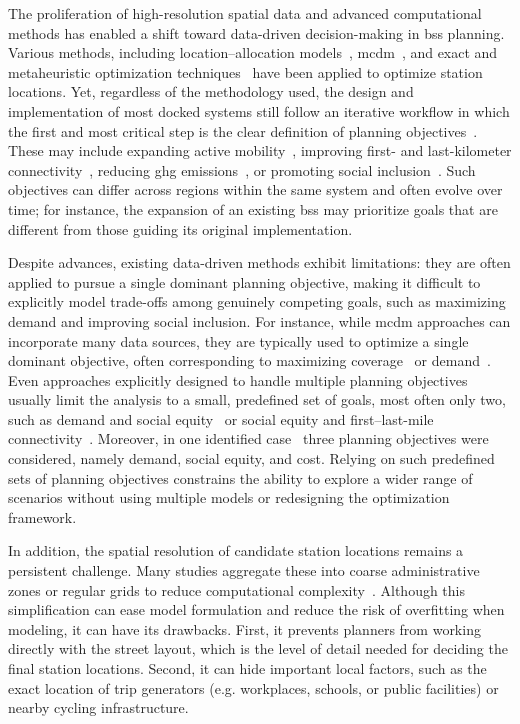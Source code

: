 The proliferation of high-resolution spatial data and advanced computational methods has enabled a shift toward data-driven decision-making in \ac{bss} planning. Various methods, including location–allocation models~\cite{Frade2015, Mete2018}, \ac{mcdm}~\cite{Kabak2018, Bahadori2022}, and exact and metaheuristic optimization techniques~\cite{Cintrano2018, Qian2022, Caggiani2020} have been applied to optimize station locations. Yet, regardless of the methodology used, the design and implementation of most docked systems still follow an iterative workflow in which the first and most critical step is the clear definition of planning objectives~\cite{Duran-Rodas2021, Ferrando2007, Yanocha2018}. These may include expanding active mobility~\cite{tfgmActiveTravel2025}, improving first- and last-kilometer connectivity~\cite{MTC2013BayAreaBSS}, reducing \ac{ghg} emissions~\cite{ctcn_velib}, or promoting social inclusion~\cite{tembiciBogota2023}. Such objectives can differ across regions within the same system and often evolve over time; for instance, the expansion of an existing \ac{bss} may prioritize goals that are different from those guiding its original implementation.

Despite advances, existing data-driven methods exhibit limitations: they are often applied to pursue a single dominant planning objective, making it difficult to explicitly model trade-offs among genuinely competing goals, such as maximizing demand and improving social inclusion. For instance, while \ac{mcdm} approaches can incorporate many data sources, they are typically used to optimize a single dominant objective, often corresponding to maximizing coverage~\cite{Fazio2021} or demand~\cite{Kabak2018, Bahadori2022}. Even approaches explicitly designed to handle multiple planning objectives usually limit the analysis to a small, predefined set of goals, most often only two, such as demand and social equity~\cite{Conrow2018, Qian2022, Caggiani2020, Duran-Rodas2021} or social equity and first–last-mile connectivity~\cite{Fan2024}. Moreover, in one identified case~\cite{Nikiforiadis2021} three planning objectives were considered, namely demand, social equity, and cost. Relying on such predefined sets of planning objectives constrains the ability to explore a wider range of scenarios without using multiple models or redesigning the optimization framework.

In addition, the spatial resolution of candidate station locations remains a persistent challenge. Many studies aggregate these into coarse administrative zones or regular grids to reduce computational complexity~\cite{Frade2015, Fazio2021, Veillette2018, Nikiforiadis2021}. Although this simplification can ease model formulation and reduce the risk of overfitting when modeling, it can have its drawbacks. First, it prevents planners from working directly with the street layout, which is the level of detail needed for deciding the final station locations. Second, it can hide important local factors, such as the exact location of trip generators (e.g. workplaces, schools, or public facilities) or nearby cycling infrastructure.

